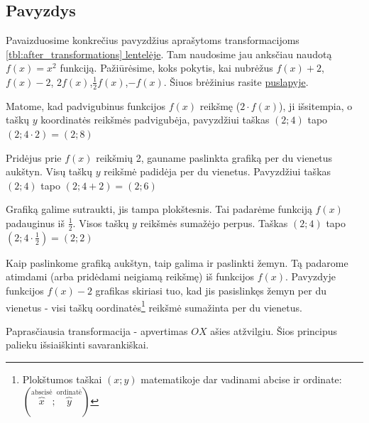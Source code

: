 \documentclass[nobib]{tufte-handout}
\begin{document}
\subsection{Pavyzdys}\label{sec:function_transformation_example}

Pavaizduosime konkrečius pavyzdžius
aprašytoms transformacijoms
\hyperref[tbl:after_transformations]{\ref*{tbl:after_transformations}
  lentelėje}. Tam naudosime jau anksčiau naudotą $f(x)=x^2$ funkciją.
Pažiūrėsime, koks pokytis, kai nubrėžus $f(x)+2$,  $f(x)-2$,
$2f(x)$,$\frac{1}{2}f(x)$,$-f(x)$. Šiuos brėžinius rasite
\hyperref[sec:function_transformation_example]{\pageref*{fig:function_transformation_example}
  puslapyje}.

Matome, kad padvigubinus funkcijos $f(x)$ reikšmę ($2 \cdot f(x)$),
ji išsitempia, o taškų $y$ koordinatės reikšmės padvigubėja, pavyzdžiui taškas
$(2; 4)$ tapo $(2;4 \cdot 2)=(2;8)$

Pridėjus prie $f(x)$ reikšmių 2, gauname paslinkta grafiką per du vienetus
aukštyn. Visų taškų $y$ reikšmė padidėja per du vienetus. Pavyzdžiui taškas
$(2; 4)$ tapo $(2;4 + 2)=(2;6)$

Grafiką galime sutraukti, jis tampa plokštesnis. Tai padarėme funkciją $f(x)$
padauginus iš $\frac{1}{2}$. Visos taškų $y$ reikšmės sumažėjo perpus. Taškas
$(2; 4)$ tapo $(2;4 \cdot \frac{1}{2})=(2;2)$

Kaip paslinkome grafiką aukštyn, taip galima ir paslinkti žemyn. Tą padarome
atimdami (arba pridėdami neigiamą reikšmę) iš funkcijos $f(x)$. Pavyzdyje
funkcijos $f(x)-2$ grafikas skiriasi tuo, kad jis pasislinkęs žemyn per du
vienetus - visi taškų oordinatės\footnote{Plokštumos taškai $(x;y)$
matematikoje dar vadinami abcise ir ordinate: $
  (\overbrace{x}^{\text{abscisė}};
  \overbrace{y}^{\text{ordinatė}})$} reikšmė sumažinta per du
vienetus.

Paprasčiausia transformacija - apvertimas $OX$ ašies atžvilgiu.
Šios principus palieku išsiaiškinti savarankiškai.
\end{document}
